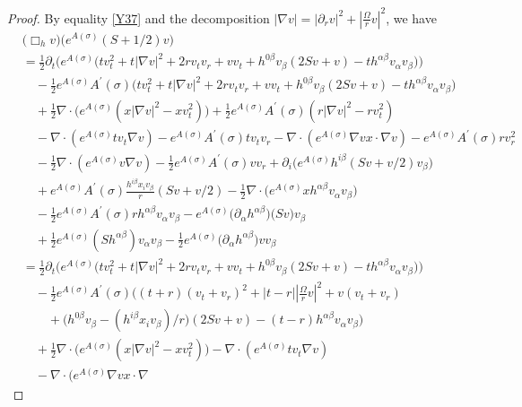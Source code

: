 \documentclass[11pt, reqno]{amsart}
\theoremstyle{definition}
\theoremstyle{remark}
\theoremstyle{definition}
\numberwithin{equation}{section}
\numberwithin{equation}{section}
\begin{document}
\begin{proof}
By equality \eqref{Y37} and the decomposition $|\nabla
v|=|\partial_rv|^2+|\frac{\Omega }rv|^2$, we have
\begin{align}\label{Y8}
&\big(\Box_h
v\big)\big(e^{A(\sigma)}(S+1/2)v\big)
\nonumber\\&=\frac12\partial_t\Big(e^{A(\sigma)}\big(tv_t^2+t|\nabla
v|^2+2rv_tv_r+vv_t+h^{0\beta}v_{\beta}(2Sv+v)-th^{\alpha\beta}v_{\alpha}v_{\beta}\big)\Big)
\nonumber\\&\quad-\frac12e^{A(\sigma)}A^{'}(\sigma)\Big(tv_t^2+t|\nabla
v|^2+2rv_tv_r+vv_t+h^{0\beta}v_{\beta}(2Sv+v)-th^{\alpha\beta}v_{\alpha}v_{\beta}\Big)
\nonumber\\&\quad+\frac12\nabla\cdot\big(e^{A(\sigma)}(x|\nabla
v|^2-xv_t^2)\big)+\frac12e^{A(\sigma)}A^{'}(\sigma)(r|\nabla
v|^2-rv_t^2)
\nonumber\\&\quad-\nabla\cdot(e^{A(\sigma)}tv_t\nabla
v)-e^{A(\sigma)}A^{'}(\sigma)tv_tv_r
-\nabla\cdot(e^{A(\sigma)}\nabla
vx\cdot\nabla v)-e^{A(\sigma)}A^{'}(\sigma)rv_r^2
\nonumber\\&\quad-\frac12\nabla\cdot(e^{A(\sigma)}v\nabla
v)-\frac12e^{A(\sigma)}A^{'}(\sigma)vv_r+
\partial_i\big(e^{A(\sigma)}h^{i\beta}(Sv+v/2)v_{\beta}\big)\nonumber\\&\quad
+e^{A(\sigma)}A^{'}(\sigma)\frac{h^{i\beta}x_iv_{\beta}}r(Sv+v/2)
-\frac12\nabla\cdot\big(e^{A(\sigma)}xh^{\alpha\beta}v_{\alpha}v_{\beta}\big)
\nonumber\\&\quad-\frac12e^{A(\sigma)}A^{'}(\sigma)rh^{\alpha\beta}v_{\alpha}v_{\beta}
-e^{A(\sigma)}\big(\partial_{\alpha}h^{\alpha\beta}\big)\big(Sv\big)v_{\beta}
\nonumber\\&\quad+\frac12e^{A(\sigma)}(Sh^{\alpha\beta})v_{\alpha}v_{\beta}
-\frac12e^{A(\sigma)}\big(\partial_{\alpha}h^{\alpha\beta}\big)vv_{\beta}
\nonumber\\&=\frac12\partial_t\Big(e^{A(\sigma)}\big(tv_t^2+t|\nabla
v|^2+2rv_tv_r+vv_t+h^{0\beta}v_{\beta}(2Sv+v)-th^{\alpha\beta}v_{\alpha}v_{\beta}\big)\Big)
\nonumber\\&\quad
-\frac12e^{A(\sigma)}A^{'}(\sigma)\Big((t+r)(v_t+v_r)^2+|t-r||\frac{\Omega}rv|^2
+v(v_t+v_r)\nonumber\\&\qquad+\big(h^{0\beta}v_{\beta}
-(h^{i\beta}x_iv_{\beta})/r\big)(2Sv+v)-(t-r)h^{\alpha\beta}v_{\alpha}v_{\beta}\Big)
\nonumber\\&\quad+\frac12\nabla\cdot\big(e^{A(\sigma)}(x|\nabla
v|^2-xv_t^2)\big)-\nabla\cdot(e^{A(\sigma)}tv_t\nabla v)
\nonumber\\&\quad-\nabla\cdot(e^{A(\sigma)}\nabla vx\cdot\nabla

\end{align}
\end{proof}
\end{document}
